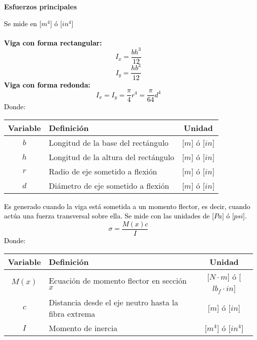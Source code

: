 \documentclass[letterpaper,11pt]{extarticle}
\newcommand{\mybox}[2]
{
    \begin{tcolorbox}[colback=color!5!white,colframe=color!75!black,boxsep=1pt,arc=0pt,outer arc=0pt,title={\textcolor{white}{#1}}]
        \textcolor{black}{#2}
    \end{tcolorbox}
}
\begin{document}
    \begin{center} \textbf{Esfuerzos principales} \end{center}
    \begin{multicols}{2}
        \mybox{Esfuerzos principales:}
        {
            Se mide en [$m^4$] ó [$in^4$] \\\\
            \textbf{Viga con forma rectangular:}
            \begin{equation}
                I_x = \frac{bh^3}{12}
            \end{equation}
            \begin{equation}
                I_y = \frac{hb^3}{12}
            \end{equation}
            \textbf{Viga con forma redonda:}
            \begin{equation}
                I_x = I_y = \frac{\pi}{4}r^4 = \frac{\pi}{64}d^4
            \end{equation}
            Donde:
            \begin{center}
                \begin{tabular}{ c | p{35mm} | c }
                    \hline Variable & Definición & Unidad \\ \hline 
                    $b$ & Longitud de la base del rectángulo & [$m$] ó [$in$]\\
                    $h$ & Longitud de la altura del rectángulo & [$m$] ó [$in$]\\
                    $r$ & Radio de eje sometido a flexión & [$m$] ó [$in$]\\
                    $d$ & Diámetro de eje sometido a flexión & [$m$] ó [$in$]\\ \hline
                \end{tabular}
            \end{center}
        }

        \mybox{Esfuerzo normal:}
        {
            Es generado cuando la viga está sometida a un momento flector, es decir, cuando actúa una fuerza transversal sobre ella. Se mide con las unidades de [$Pa$] ó [$psi$]. \\ 
            \begin{equation}
                \sigma = \frac{M(x)c}{I}
            \end{equation}
            Donde:
            \begin{center}
                \begin{tabular}{ c | p{25mm} | c }
                    \hline Variable & Definición & Unidad \\ \hline 
                    $M(x)$ & Ecuación de momento flector en sección $x$ & [$N \cdot m$] ó [$lb_f\cdot in$]\\
                    $c$ & Distancia desde el eje neutro hasta la fibra extrema & [$m$] ó [$in$]\\
                    $I$ & Momento de inercia & [$m^4$] ó [$in^4$]\\ \hline
                \end{tabular}
            \end{center}
        }


\end{multicols}
\end{document}
